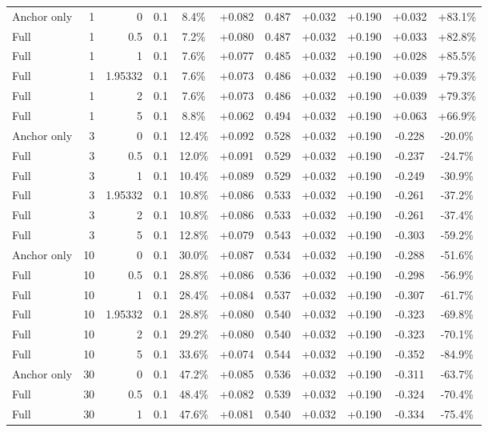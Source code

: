 \begin{table}[htbp]
\begin{tabular}{lrrrccccccc}
Anchor only & 1 & 0 & 0.1 & 8.4\% & +0.082 & 0.487 & +0.032 & +0.190 & +0.032 & +83.1\% \\
Full & 1 & 0.5 & 0.1 & 7.2\% & +0.080 & 0.487 & +0.032 & +0.190 & +0.033 & +82.8\% \\
Full & 1 & 1 & 0.1 & 7.6\% & +0.077 & 0.485 & +0.032 & +0.190 & +0.028 & +85.5\% \\
Full & 1 & 1.95332 & 0.1 & 7.6\% & +0.073 & 0.486 & +0.032 & +0.190 & +0.039 & +79.3\% \\
Full & 1 & 2 & 0.1 & 7.6\% & +0.073 & 0.486 & +0.032 & +0.190 & +0.039 & +79.3\% \\
Full & 1 & 5 & 0.1 & 8.8\% & +0.062 & 0.494 & +0.032 & +0.190 & +0.063 & +66.9\% \\
Anchor only & 3 & 0 & 0.1 & 12.4\% & +0.092 & 0.528 & +0.032 & +0.190 & -0.228 & -20.0\% \\
Full & 3 & 0.5 & 0.1 & 12.0\% & +0.091 & 0.529 & +0.032 & +0.190 & -0.237 & -24.7\% \\
Full & 3 & 1 & 0.1 & 10.4\% & +0.089 & 0.529 & +0.032 & +0.190 & -0.249 & -30.9\% \\
Full & 3 & 1.95332 & 0.1 & 10.8\% & +0.086 & 0.533 & +0.032 & +0.190 & -0.261 & -37.2\% \\
Full & 3 & 2 & 0.1 & 10.8\% & +0.086 & 0.533 & +0.032 & +0.190 & -0.261 & -37.4\% \\
Full & 3 & 5 & 0.1 & 12.8\% & +0.079 & 0.543 & +0.032 & +0.190 & -0.303 & -59.2\% \\
Anchor only & 10 & 0 & 0.1 & 30.0\% & +0.087 & 0.534 & +0.032 & +0.190 & -0.288 & -51.6\% \\
Full & 10 & 0.5 & 0.1 & 28.8\% & +0.086 & 0.536 & +0.032 & +0.190 & -0.298 & -56.9\% \\
Full & 10 & 1 & 0.1 & 28.4\% & +0.084 & 0.537 & +0.032 & +0.190 & -0.307 & -61.7\% \\
Full & 10 & 1.95332 & 0.1 & 28.8\% & +0.080 & 0.540 & +0.032 & +0.190 & -0.323 & -69.8\% \\
Full & 10 & 2 & 0.1 & 29.2\% & +0.080 & 0.540 & +0.032 & +0.190 & -0.323 & -70.1\% \\
Full & 10 & 5 & 0.1 & 33.6\% & +0.074 & 0.544 & +0.032 & +0.190 & -0.352 & -84.9\% \\
Anchor only & 30 & 0 & 0.1 & 47.2\% & +0.085 & 0.536 & +0.032 & +0.190 & -0.311 & -63.7\% \\
Full & 30 & 0.5 & 0.1 & 48.4\% & +0.082 & 0.539 & +0.032 & +0.190 & -0.324 & -70.4\% \\
Full & 30 & 1 & 0.1 & 47.6\% & +0.081 & 0.540 & +0.032 & +0.190 & -0.334 & -75.4\% \\

\end{tabular}
\end{table}
